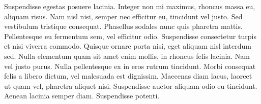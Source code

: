 Suspendisse egestas posuere lacinia. Integer non mi maximus, rhoncus massa eu, aliquam risus. Nam nisl nisi, semper nec efficitur eu, tincidunt vel justo. Sed vestibulum tristique consequat. Phasellus sodales nunc quis pharetra mattis. Pellentesque eu fermentum sem, vel efficitur odio. Suspendisse consectetur turpis et nisi viverra commodo. Quisque ornare porta nisi, eget aliquam nisl interdum sed. Nulla elementum quam sit amet enim mollis, in rhoncus felis lacinia. Nam vel justo purus. Nulla pellentesque ex in eros rutrum tincidunt. Morbi consequat felis a libero dictum, vel malesuada est dignissim. Maecenas diam lacus, laoreet ut quam vel, pharetra aliquet nisi. Suspendisse auctor aliquam odio eu tincidunt. Aenean lacinia semper diam. Suspendisse potenti.
